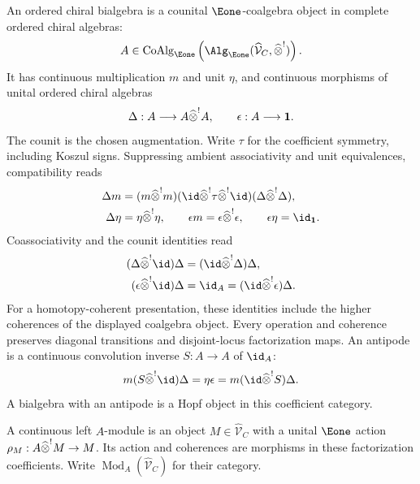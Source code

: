\begin{definition}\label{def:vol4-ordered-chiral-bialgebra}
An ordered chiral bialgebra is a counital $\Eone$-coalgebra object
in complete ordered chiral algebras:
\[
 A\in\operatorname{CoAlg}_{\Eone}
 \left(\Alg_{\Eone}
 (\widehat{\mathcal V}_C,\widehat{\tensor}^{!})\right).
\]
It has continuous multiplication $m$ and unit $\eta$, and continuous
morphisms of unital ordered chiral algebras
\[
 \Delta:A\longrightarrow A\widehat{\mathbin{\otimes}}^{!}A,
 \qquad \epsilon:A\longrightarrow\mathbf1.
\]
The counit is the chosen augmentation.
Write $\tau$ for the coefficient symmetry, including Koszul signs.
Suppressing ambient associativity and unit equivalences, compatibility reads
\[
\begin{aligned}
 \Delta m&=(m\widehat{\tensor}^{!}m)
  (\id\widehat{\tensor}^{!}\tau\widehat{\tensor}^{!}\id)
  (\Delta\widehat{\tensor}^{!}\Delta),\\
 \Delta\eta&=\eta\widehat{\tensor}^{!}\eta,
 \qquad \epsilon m=\epsilon\widehat{\tensor}^{!}\epsilon,
 \qquad \epsilon\eta=\id_{\mathbf1}.
\end{aligned}
\]
Coassociativity and the counit identities read
\[
\begin{aligned}
 (\Delta\widehat{\tensor}^{!}\id)\Delta
   &=(\id\widehat{\tensor}^{!}\Delta)\Delta,\\
 (\epsilon\widehat{\tensor}^{!}\id)\Delta
   &=\id_A=(\id\widehat{\tensor}^{!}\epsilon)\Delta.
\end{aligned}
\]
For a homotopy-coherent presentation, these identities include the
higher coherences of the displayed coalgebra object.
Every operation and coherence preserves diagonal transitions and
disjoint-locus factorization maps.
An antipode is a continuous convolution inverse $S:A\to A$ of $\id_A$:
\[
 m(S\widehat{\tensor}^{!}\id)\Delta
 =\eta\epsilon
 =m(\id\widehat{\tensor}^{!}S)\Delta.
\]
A bialgebra with an antipode is a Hopf object in this coefficient category.
\end{definition}

A continuous left $A$-module is an object $M\in\widehat{\mathcal V}_C$
with a unital $\Eone$ action
$\rho_M:A\widehat{\mathbin{\otimes}}^{!}M\to M$.
Its action and coherences are morphisms in these factorization coefficients.
Write $\operatorname{Mod}_A(\widehat{\mathcal V}_C)$ for their category.

